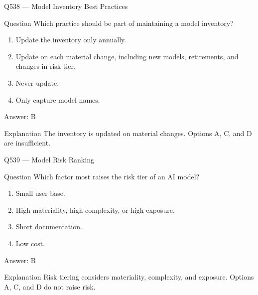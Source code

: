 \documentclass[aspectratio=169,8pt]{beamer}
\begin{document}
	\begin{frame}{Q538 --- Model Inventory Best Practices}
		\begin{block}{Question}
			Which practice should be part of maintaining a model inventory?
			\begin{enumerate}
				\item Update the inventory only annually.
				\item Update on each material change, including new models, retirements, and changes in risk tier.
				\item Never update.
				\item Only capture model names.
			\end{enumerate}
		\end{block}
		\begin{exampleblock}{Answer: B}\end{exampleblock}
		\begin{block}{Explanation}
			The inventory is updated on material changes. Options A, C, and D are insufficient.
		\end{block}
	\end{frame}
	
	\begin{frame}{Q539 --- Model Risk Ranking}
		\begin{block}{Question}
			Which factor most raises the risk tier of an AI model?
			\begin{enumerate}
				\item Small user base.
				\item High materiality, high complexity, or high exposure.
				\item Short documentation.
				\item Low cost.
			\end{enumerate}
		\end{block}
		\begin{exampleblock}{Answer: B}\end{exampleblock}
		\begin{block}{Explanation}
			Risk tiering considers materiality, complexity, and exposure. Options A, C, and D do not raise risk.
		\end{block}
	\end{frame}
	
\end{document}
